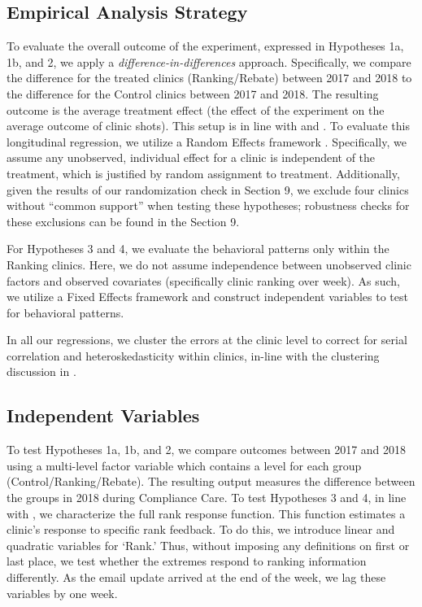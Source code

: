  \subsection{Empirical Analysis Strategy} \label{emp_strat}
 To evaluate the overall outcome of the experiment, expressed in Hypotheses 1a, 1b, and 2, we apply a \textit{difference-in-differences} approach. Specifically, we compare the difference for the treated clinics (Ranking/Rebate) between 2017 and 2018 to the difference for the Control clinics between 2017 and 2018. The resulting outcome is the average treatment effect (the effect of the experiment on the average outcome of clinic shots). This setup is in line with \cite{Bertrand2004} and \cite{Wing2018}. To evaluate this longitudinal regression, we utilize a Random Effects framework \citep[as defined in][]{Wooldridge2010}. Specifically, we assume any unobserved, individual effect for a clinic is independent of the treatment, which is justified by random assignment to treatment. Additionally, given the results of our randomization check in Section 9, we exclude four clinics without “common support” when testing these hypotheses; robustness checks for these exclusions can be found in the Section 9.
 
 For Hypotheses 3 and 4, we evaluate the behavioral patterns only within the Ranking clinics. Here, we do not assume independence between unobserved clinic factors and observed covariates (specifically clinic ranking over week). As such, we utilize a Fixed Effects framework \citep[][]{Wooldridge2010} and construct independent variables to test for behavioral patterns.
 
 In all our regressions, we cluster the errors at the clinic level to correct for serial correlation and heteroskedasticity within clinics, in-line with the clustering discussion in \cite{Bertrand2004}. 
 
 \subsection{Independent Variables}
 To test Hypotheses 1a, 1b, and 2, we compare outcomes between 2017 and 2018 using a multi-level factor variable which contains a level for each group (Control/Ranking/Rebate). The resulting output measures the difference between the groups in 2018 during Compliance Care. To test Hypotheses 3 and 4, in line with \cite{Gill2019}, we characterize the full rank response function. This function estimates a clinic’s response to specific rank feedback. To do this, we introduce linear and quadratic variables for ‘Rank.’ Thus, without imposing any definitions on first or last place, we test whether the extremes respond to ranking information differently. As the email update arrived at the end of the week, we lag these variables by one week.
 

